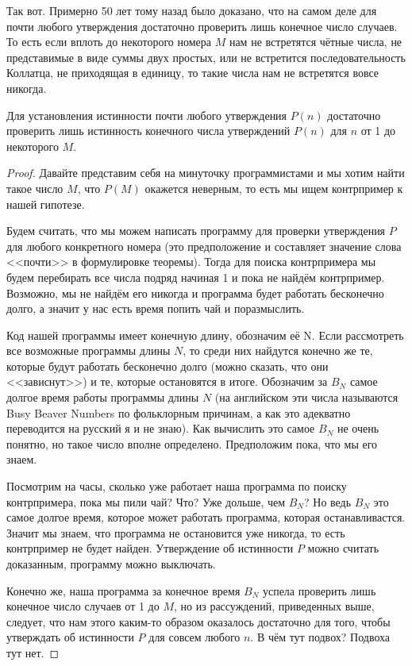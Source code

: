 Так вот. Примерно 50 лет тому назад было доказано, что на самом деле для почти любого утверждения достаточно проверить лишь конечное число случаев. То есть если вплоть до некоторого номера $M$ нам не встретятся чётные числа, не представимые в виде суммы двух простых, или не встретится последовательность Коллатца, не приходящая в единицу, то такие числа нам не встретятся вовсе никогда.

\begin{thm}
Для установления истинности почти любого утверждения $P(n)$ достаточно проверить лишь истинность конечного числа утверждений $P(n)$ для $n$ от 1 до некоторого $M$.
\end{thm}
\begin{proof}
Давайте представим себя на минуточку программистами и мы хотим найти такое число $M$, что $P(M)$ окажется неверным, то есть мы ищем контрпример к нашей гипотезе.

Будем считать, что мы можем написать программу для проверки утверждения $P$ для любого конкретного номера (это предположение и составляет значение слова <<почти>> в формулировке теоремы). Тогда для поиска контрпримера мы будем перебирать все числа подряд начиная 1 и пока не найдём контрпример. Возможно, мы не найдём его никогда и программа будет работать бесконечно долго, а значит у нас есть время попить чай и поразмыслить.

Код нашей программы имеет конечную длину, обозначим её N. Если рассмотреть все возможные программы длины $N$, то среди них найдутся конечно же те, которые будут работать бесконечно долго (можно сказать, что они <<зависнут>>) и те, которые остановятся в итоге. Обозначим за $B_N$ самое долгое время работы программы длины $N$ (на английском эти числа называются Busy Beaver Numbers по фольклорным причинам, а как это адекватно переводится на русский я и не знаю). Как вычислить это самое $B_N$ не очень понятно, но такое число вполне определено. Предположим пока, что мы его знаем.

Посмотрим на часы, сколько уже работает наша программа по поиску контрпримера, пока мы пили чай? Что? Уже дольше, чем $B_N$? Но ведь $B_N$ это самое долгое время, которое может работать программа, которая останавливастся. Значит мы знаем, что программа не остановится уже никогда, то есть контрпример не будет найден. Утверждение об истинности $P$ можно считать доказанным, программу можно выключать.

Конечно же, наша программа за конечное время $B_N$ успела проверить лишь конечное число случаев от 1 до $M$, но из рассуждений, приведенных выше, следует, что нам этого каким-то образом оказалось достаточно для того, чтобы утверждать об истинности $P$ для совсем любого $n$. В чём тут подвох? Подвоха тут нет. 
\end{proof}


